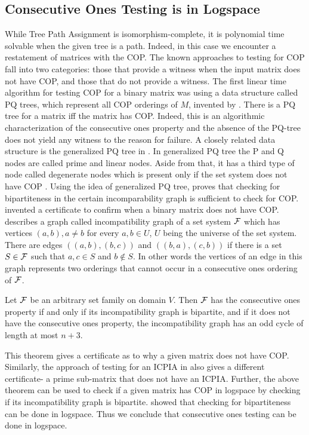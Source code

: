 \subsection{Consecutive Ones Testing is in Logspace}
While Tree Path Assignment is isomorphism-complete, it is polynomial
time solvable when the given tree is a path.  Indeed, in this case we
encounter a restatement of matrices with the COP.  The known
approaches to testing for COP fall into two categories: those that
provide a witness when the input matrix does not have COP, and those
that do not provide a witness.  The first linear time algorithm for
testing COP for a binary matrix was using a data structure called PQ
trees, which represent all COP orderings of $M$, invented by
\cite{bl76}. There is a PQ tree for a matrix iff the matrix has COP.
Indeed, this is an algorithmic characterization of the consecutive
ones property and the absence of the PQ-tree does not yield any
witness to the reason for failure.  A closely related data structure
is the generalized PQ tree in \cite{mcc04}.  In generalized PQ tree
the P and Q nodes are called prime and linear nodes. Aside from that,
it has a third type of node called degenerate nodes which is present
only if the set system does not have COP \cite{mcc04}.  Using the idea
of generalized PQ tree, \cite{mcc04} proves that checking for
bipartiteness in the certain incomparability graph is sufficient to
check for COP.  \cite{mcc04} invented a certificate to confirm when a
binary matrix does not have COP.  \cite{mcc04} describes a graph
called incompatibility graph of a set system ${\cal F}$ which has vertices
$(a,b), a \ne b$ for every $a, b \in U$, $U$ being the universe of the
set system. There are edges $((a,b),(b,c))$ and $((b,a),(c,b))$ if
there is a set $S \in {\cal F}$ such that $a, c \in S$ and $b \notin S$. In
other words the vertices of an edge in this graph represents two
orderings that cannot occur in a consecutive ones ordering of ${\cal F}$.
\begin{theorem}
  Let ${\cal F}$ be an arbitrary set family on domain $V$. Then ${\cal F}$ has
  the consecutive ones property if and only if its incompatibility
  graph is bipartite, and if it does not have the consecutive ones
  property, the incompatibility graph has an odd cycle of length at
  most $n+3$.
\end{theorem}
This theorem gives a certificate as to why a given matrix does not
have COP.  Similarly, the approach of testing for an ICPIA in
\cite{nsnrs09} also gives a different certificate- a prime sub-matrix
that does not have an ICPIA.  Further, the above theorem can be used
to check if a given matrix has COP in logspace by checking if its
incompatibility graph is bipartite. \cite{rei84} showed that checking
for bipartiteness can be done in logspace. Thus we conclude that
consecutive ones testing can be done in logspace.

